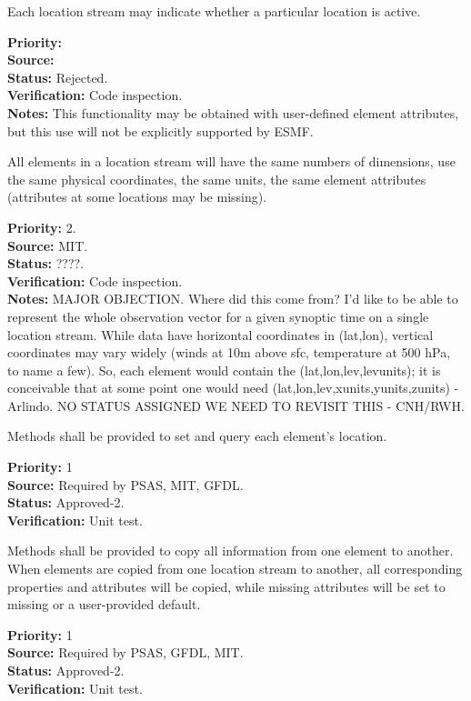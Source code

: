 Each location stream may indicate whether a particular location is active.

\begin{reqlist}
{\bf Priority:} \\
{\bf Source:} \\
{\bf Status:} Rejected. \\
{\bf Verification:} Code inspection. \\
{\bf Notes:} This functionality may be obtained with user-defined element
attributes, but this use will not be explicitly supported by ESMF.
\end{reqlist}


All elements in a location stream will have the same numbers of dimensions, use the
same physical coordinates, the same units, the same element attributes (attributes at
some locations may be missing).
\begin{reqlist}
{\bf Priority:} 2. \\
{\bf Source:} MIT. \\
{\bf Status:} ????. \\
{\bf Verification:} Code inspection. \\
{\bf Notes:} MAJOR OBJECTION. Where did this come from? I'd like to be able to represent the whole observation vector for a given synoptic time on a single location stream. While data have horizontal coordinates in (lat,lon), vertical coordinates may vary widely (winds at 10m above sfc, temperature at 500 hPa, to name a few). So, each element would contain the (lat,lon,lev,levunits); it is conceivable that at  some point one would need (lat,lon,lev,xunits,yunits,zunits) - Arlindo.
NO STATUS ASSIGNED WE NEED TO REVISIT THIS - CNH/RWH.
\end{reqlist}

Methods shall be provided to set and query each element's location.
\begin{reqlist}
{\bf Priority:} 1\\
{\bf Source:} Required by PSAS, MIT, GFDL.\\
{\bf Status:} Approved-2. \\
{\bf Verification:} Unit test.
\end{reqlist}

Methods shall be provided to copy all information from one element to another. 
When elements are copied from one location stream to another, all corresponding
properties and attributes will be copied, while missing attributes will be
set to missing or a user-provided default.
\begin{reqlist}
{\bf Priority:} 1\\
{\bf Source:} Required by PSAS, GFDL, MIT.\\
{\bf Status:} Approved-2. \\
{\bf Verification:} Unit test. 
\end{reqlist}

